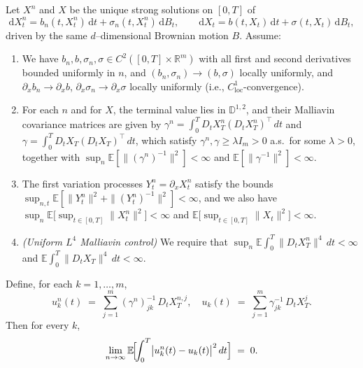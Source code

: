 \documentclass[10pt,a4paper]{amsart}
\begin{document}
\begin{theorem}
Let \(X^n\) and \(X\) be the unique strong solutions on \([0,T]\) of
\[
  \mathrm dX^n_t = b_n(t,X^n_t)\,\mathrm dt + \sigma_n(t,X^n_t)\,\mathrm dB_t,
  \qquad
  \mathrm dX_t   = b(t,X_t)\,\mathrm dt + \sigma(t,X_t)\,\mathrm dB_t,
\]
driven by the same \(d\)--dimensional Brownian motion \(B\).  Assume:
\begin{enumerate}[label=(\roman*)]
  \item We have $b_n, b, \sigma_n, \sigma \in C^2([0,T] \times \mathbb{R}^m)$ with all first and second derivatives 
    bounded uniformly in $n$, and $(b_n, \sigma_n) \to (b, \sigma)$ locally uniformly, and 
    $\partial_x b_n \to \partial_x b$, $\partial_x \sigma_n \to \partial_x \sigma$ locally uniformly 
    (i.e., $C^1_{\mathrm{loc}}$-convergence).
    
  \item For each $n$ and for $X$, the terminal value lies in $\mathbb{D}^{1,2}$, and their Malliavin 
    covariance matrices are given by
    $\gamma^n = \int_0^T D_t X_T^n (D_t X_T^n)^\top \, dt$ and 
    $\gamma = \int_0^T D_t X_T (D_t X_T)^\top \, dt$,
    which satisfy $\gamma^n, \gamma \geq \lambda I_m > 0$ a.s.\ for some $\lambda > 0$, together with
    $\sup_n \mathbb{E}[\|(\gamma^n)^{-1}\|^2] < \infty$ and $\mathbb{E}[\|\gamma^{-1}\|^2] < \infty$.
    
  \item The first variation processes $Y_t^n = \partial_x X_t^n$ satisfy the bounds
    $\sup_{n,t} \mathbb{E}[\|Y_t^n\|^2 + \|(Y_t^n)^{-1}\|^2] < \infty$, and we also have
    $\sup_n \mathbb{E}\big[\sup_{t \in [0,T]} \|X_t^n\|^2\big] < \infty$ and 
    $\mathbb{E}\big[\sup_{t \in [0,T]} \|X_t\|^2\big] < \infty$.
    
  \item \textit{(Uniform $L^4$ Malliavin control)} We require that
    $\sup_n \mathbb{E} \int_0^T \|D_t X_T^n\|^4 \, dt < \infty$ and 
    $\mathbb{E} \int_0^T \|D_t X_T\|^4 \, dt < \infty$.
\end{enumerate}
Define, for each \(k=1,\dots,m\),
\[
  u^n_k(t)
  \;=\;\sum_{j=1}^m(\gamma^n)^{-1}_{jk}\,D_tX_T^{n,j},
  \quad
  u_k(t)
  \;=\;\sum_{j=1}^m\gamma^{-1}_{jk}\,D_tX_T^j.
\]
Then for every \(k\),
\[
  \lim_{n\to\infty}
  \mathbb{E}\!\Bigl[\!\int_0^T\bigl|u^n_k(t)-u_k(t)\bigr|^2\,dt\Bigr]
  \;=\;0.
\]
\end{theorem}
\end{document}
